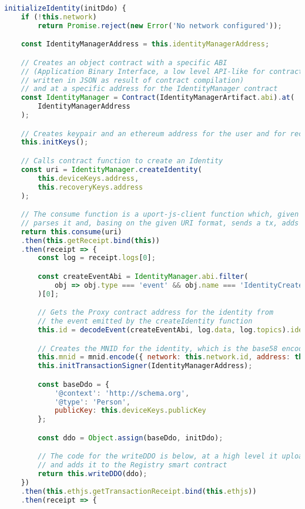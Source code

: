 \begin{lstlisting}[language=JavaScript]
initializeIdentity(initDdo) {
    if (!this.network)
        return Promise.reject(new Error('No network configured'));

    const IdentityManagerAddress = this.identityManagerAddress;

    // Creates an object contract with a specific ABI 
    // (Application Binary Interface, a low level API-like for contracts, 
    // written in JSON as result of contract compilation)
    // and at a specific address for the IdentityManager contract
    const IdentityManager = Contract(IdentityManagerArtifact.abi).at(
        IdentityManagerAddress
    );

    // Creates keypair and an ethereum address for the user and for recovery
    this.initKeys();

    // Calls contract function to create an Identity
    const uri = IdentityManager.createIdentity(
        this.deviceKeys.address,
        this.recoveryKeys.address
    );

    // The consume function is a uport-js-client function which, given a URI which conforms to the uPort Protocol specs,
    // parses it and, basing on the given URI format, sends a tx, adds an attestation or requests credentials.
    return this.consume(uri)
    .then(this.getReceipt.bind(this))
    .then(receipt => {
        const log = receipt.logs[0];

        const createEventAbi = IdentityManager.abi.filter(
            obj => obj.type === 'event' && obj.name === 'IdentityCreated'
        )[0];

        // Gets the Proxy contract address for the identity from
        // the event emitted by the createIdentity function
        this.id = decodeEvent(createEventAbi, log.data, log.topics).identity;

        // Creates the MNID for the identity, which is the base58 encoding of the network id and the identity Proxy address
        this.mnid = mnid.encode({ network: this.network.id, address: this.id });
        this.initTransactionSigner(IdentityManagerAddress);

        const baseDdo = {
            '@context': 'http://schema.org',
            '@type': 'Person',
            publicKey: this.deviceKeys.publicKey
        };

        const ddo = Object.assign(baseDdo, initDdo);

        // The code for the writeDDO is below, at a high level it uploads the ddo object to IPFS
        // and adds it to the Registry smart contract
        return this.writeDDO(ddo);
    })
    .then(this.ethjs.getTransactionReceipt.bind(this.ethjs))
    .then(receipt => {
        

\end{lstlisting}
